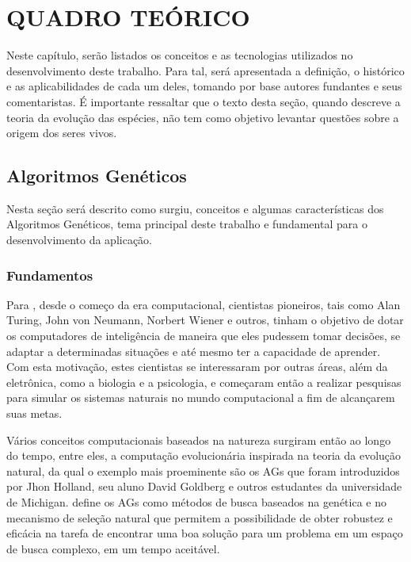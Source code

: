 \chapter{QUADRO TEÓRICO} \label{quadro_teorico}

\par Neste capítulo, serão listados os conceitos e as tecnologias 
utilizados no desenvolvimento deste trabalho. Para tal, será apresentada 
a definição, o histórico e as aplicabilidades de cada um deles, tomando por 
base autores fundantes e seus comentaristas. É importante ressaltar que o texto desta 
seção, quando descreve a teoria da evolução das espécies, não tem como objetivo levantar
questões sobre a origem dos seres vivos.

\section{Algoritmos Genéticos}

\par Nesta seção será descrito como surgiu, conceitos e algumas características
dos Algoritmos Genéticos, tema principal deste trabalho e fundamental para o
desenvolvimento da aplicação.

\subsection{Fundamentos}

\par Para , desde o começo da
era computacional, cientistas pioneiros, tais como Alan Turing, John von
Neumann, Norbert Wiener e outros, tinham o objetivo de dotar os computadores de inteligência
de maneira que eles pudessem tomar decisões, se adaptar a determinadas situações
e até mesmo ter a capacidade de aprender. Com esta motivação, estes cientistas
se interessaram por outras áreas, além da eletrônica, como  a
biologia e a psicologia, e começaram então a realizar pesquisas para simular os
sistemas naturais no mundo computacional a fim de alcançarem suas metas. 

\par Vários conceitos computacionais baseados na natureza surgiram então ao
longo do tempo, entre eles, a computação evolucionária inspirada na teoria da
evolução natural, da qual o exemplo mais proeminente são os AGs que foram
introduzidos por Jhon Holland, seu aluno David Goldberg e outros estudantes da universidade de Michigan.
 define os AGs como métodos de busca baseados na
genética e no mecanismo de seleção natural que permitem a possibilidade de obter
robustez e eficácia na tarefa de encontrar uma boa solução para um problema
em um espaço de busca complexo, em um tempo aceitável.


